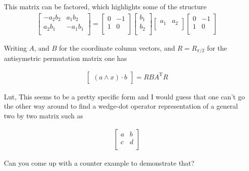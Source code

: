 \documentclass{article}
\newcommand{\T}[0]{{\text{T}}}
\begin{document}
This matrix can be factored, which highlights some of the structure
\begin{align*}
\begin{bmatrix}
- a_2 b_2 & a_1 b_2  \\
a_2 b_1 & -a_1 b_1 \\
\end{bmatrix}
=
\begin{bmatrix}
0 & -1 \\
1 & 0 \\
\end{bmatrix}
\begin{bmatrix}
b_1 \\
b_2 \\
\end{bmatrix}
\begin{bmatrix}
a_1 & a_2 \\
\end{bmatrix}
\begin{bmatrix}
0 & -1 \\
1 & 0 \\
\end{bmatrix}
\end{align*}

Writing $A$, and $B$ for the coordinate column vectors, and $R = R_{\pi/2}$ for the antisymetric permutation matrix one has 

\begin{align*}
\begin{bmatrix}
(a \wedge x) \cdot b
\end{bmatrix}
=
R B A^\T R
\end{align*}

Lut, This seems to be a pretty specific form and I would guess that one can't go the other way around to find a wedge-dot operator representation of a general two by two
matrix such as

\begin{align*}
\begin{bmatrix}
a & b \\
c & d \\
\end{bmatrix}
\end{align*}

Can you come up with a counter example to demonstrate that?

%
%
\end{document}
